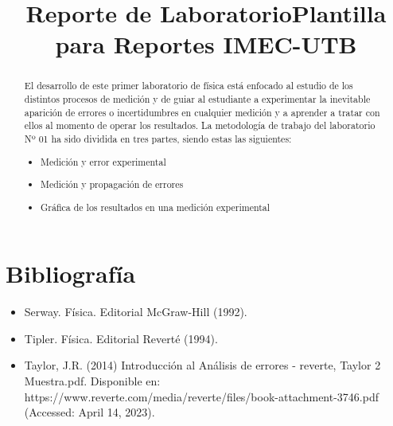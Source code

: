 \documentclass[10pt]{article}
\title{Reporte de Laboratorio}
\title{Plantilla para Reportes IMEC-UTB}
\begin{document}


\tableofcontents

\newpage

\begin{abstract}
	El desarrollo de este primer laboratorio de física está enfocado al estudio de los distintos procesos de medición y de guiar al estudiante a experimentar la inevitable aparición de errores o incertidumbres en cualquier medición y a aprender a tratar con ellos al momento de operar los resultados.
	La metodología de trabajo del laboratorio Nº 01 ha sido dividida en tres partes, siendo estas las siguientes:
	\begin{itemize}
		\item Medición y error experimental
		\item Medición y propagación de errores
		\item Gráfica de los resultados en una medición experimental
	\end{itemize}

\end{abstract}

\section{Bibliografía}
\begin{itemize}
	\item  Serway. F\'isica. Editorial McGraw-Hill (1992).\\
	\item Tipler. Física. Editorial Revert\'e (1994). \\
	\item Taylor, J.R. (2014) Introducci\'on al Análisis de errores - reverte, Taylor 2 Muestra.pdf. Disponible en: https://www.reverte.com/media/reverte/files/book-attachment-3746.pdf (Accessed: April 14, 2023).
\end{itemize}
\end{document}
